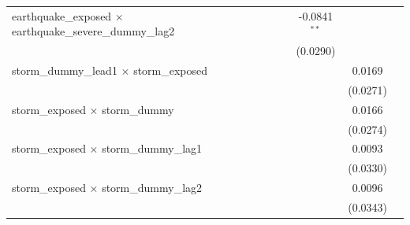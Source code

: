 \begin{tabular}{lcccccccc}
   earthquake\_exposed $\times$ earthquake\_severe\_dummy\_lag2       &                       &                       &                       &                       &                       & -0.0841$^{**}$        &                       &   \\   
                                                                      &                       &                       &                       &                       &                       & (0.0290)              &                       &   \\   
   storm\_dummy\_lead1 $\times$ storm\_exposed                        &                       &                       &                       &                       &                       &                       & 0.0169                &   \\   
                                                                      &                       &                       &                       &                       &                       &                       & (0.0271)              &   \\   
   storm\_exposed $\times$ storm\_dummy                               &                       &                       &                       &                       &                       &                       & 0.0166                &   \\   
                                                                      &                       &                       &                       &                       &                       &                       & (0.0274)              &   \\   
   storm\_exposed $\times$ storm\_dummy\_lag1                         &                       &                       &                       &                       &                       &                       & 0.0093                &   \\   
                                                                      &                       &                       &                       &                       &                       &                       & (0.0330)              &   \\   
   storm\_exposed $\times$ storm\_dummy\_lag2                         &                       &                       &                       &                       &                       &                       & 0.0096                &   \\   
                                                                      &                       &                       &                       &                       &                       &                       & (0.0343)              &   \\   

\end{tabular}
